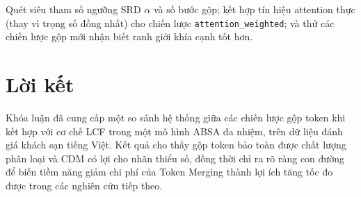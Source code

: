 Quét siêu tham số ngưỡng SRD $\alpha$ và số bước gộp; kết hợp tín hiệu
attention thực (thay vì trọng số đồng nhất) cho chiến lược
\texttt{attention\_weighted}; và thử các chiến lược gộp mới nhận biết
ranh giới khía cạnh tốt hơn.

\section*{Lời kết}

Khóa luận đã cung cấp một so sánh hệ thống giữa các chiến lược gộp token
khi kết hợp với cơ chế LCF trong một mô hình ABSA đa nhiệm, trên dữ liệu
đánh giá khách sạn tiếng Việt. Kết quả cho thấy gộp token bảo toàn được
chất lượng phân loại và CDM có lợi cho nhãn thiểu số, đồng thời chỉ ra rõ
ràng con đường để biến tiềm năng giảm chi phí của Token Merging thành lợi
ích tăng tốc đo được trong các nghiên cứu tiếp theo.
